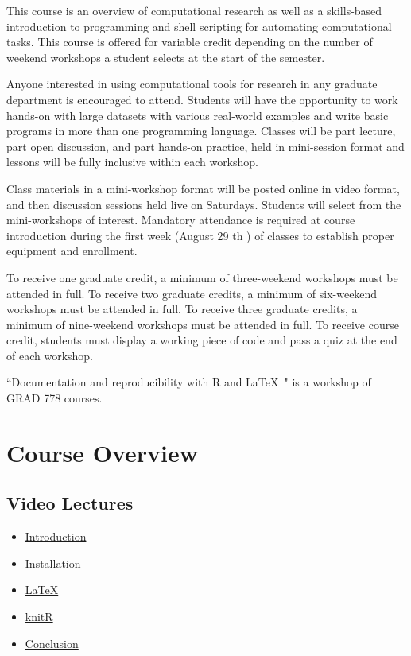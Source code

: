 \documentclass[12pt]{article}
\providecommand{\tightlist}{%
  \setlength{\itemsep}{0pt}\setlength{\parskip}{0pt}}
\begin{document}
This course is an overview of computational research as well as a skills-based introduction to programming and shell scripting for automating computational tasks. This course is offered for variable credit depending on the number of weekend workshops a student selects at the start of the semester.

Anyone interested in using computational tools for research in any graduate department is encouraged to attend. Students will have the opportunity to work hands-on with large datasets with various real-world examples and write basic programs in more than one programming language. Classes will be part lecture, part open discussion, and part hands-on practice, held in mini-session format and lessons will be fully inclusive within each workshop.

Class materials in a mini-workshop format will be posted online in video format, and then discussion sessions held live on Saturdays. Students will select from the mini-workshops of interest. Mandatory attendance is required at course introduction during the first week (August 29 th ) of classes to establish proper equipment and enrollment.

To receive one graduate credit, a minimum of three-weekend workshops must be attended in full. To receive two graduate credits, a minimum of six-weekend workshops must be attended in full. To receive three graduate credits, a minimum of nine-weekend workshops must be attended in full. To receive course credit, students must display a working piece of code and pass a quiz at the end of each workshop.

``Documentation and reproducibility with R and \LaTeX\ " is a workshop of GRAD 778 courses.

\section{Course Overview}

\subsection{Video Lectures}

\begin{itemize}
      \tightlist
      \item
            \href{https://youtu.be/5isfqu7dhmk}{Introduction}
      \item
            \href{https://youtu.be/qk4YiRPovNM}{Installation}
      \item
            \href{https://youtu.be/Ec3jqBKuXyk}{LaTeX}
      \item
            \href{https://youtu.be/LGOApODWJlE}{knitR}
      \item
            \href{https://youtu.be/C1Xv3riRZno}{Conclusion}
\end{itemize}
\end{document}
